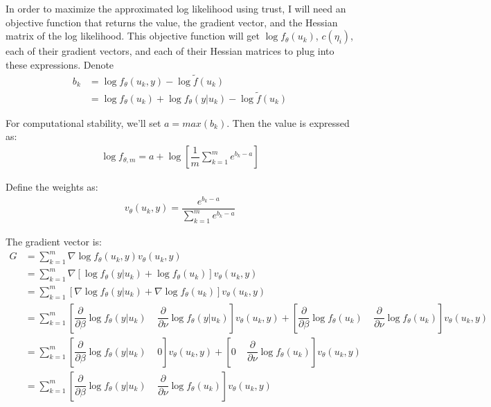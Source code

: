 \documentclass{article}
\begin{document}
In order to maximize the approximated log likelihood using trust, I will need an objective function that returns the value, the gradient vector, and the Hessian matrix of the log likelihood.  This objective function will get $\log f_\theta (u_k)$, $c(\eta_i)$, each of their gradient vectors, and each of their Hessian matrices to plug into these expressions.    Denote\\
\begin{align}
b_k &=  \log f_\theta (u_k,y)- \log \tilde{f} (u_k) \\
&= \log f_\theta (u_k) + \log f_\theta (y|u_k) - \log \tilde{f} (u_k) \label{eq:MCLA}
\end{align}


For computational stability, we'll set $a=max(b_k)$. Then the value is expressed as:\\
\begin{align}
\log f_{\theta,m} = a+ \log \left[ \dfrac{1}{m}  \sum_{k=1}^m e^{b_k-a} \right]
\end{align}

Define the weights as:\\
\begin{align}
v_\theta(u_k,y) = \dfrac{e^{b_k-a}}{ \sum_{k=1}^m e^{b_k-a}} 
\end{align}

The gradient vector is: \\
\begin{align}
G &= \sum_{k=1}^m \nabla \log f_\theta (u_k,y) v_\theta(u_k,y)\\ \label{eq:gradient}
&= \sum_{k=1}^m \nabla \left[  \log f_\theta(y|u_k) + \log f_\theta (u_k)  \right] v_\theta(u_k,y)\\
&= \sum_{k=1}^m  \left[ \nabla \log f_\theta(y|u_k) + \nabla\log f_\theta (u_k)  \right] v_\theta(u_k,y)\\
&= \sum_{k=1}^m  \left[ \dfrac{\partial}{\partial \beta} \log f_\theta(y|u_k) \; \; \; \;  \dfrac{\partial}{\partial \nu} \log f_\theta(y|u_k) \right] v_\theta(u_k,y)+ \left[ \dfrac{\partial}{\partial \beta} \log f_\theta(u_k) \; \; \; \; \dfrac{\partial}{\partial \nu} \log f_\theta(u_k) \right] v_\theta(u_k,y)\\
&= \sum_{k=1}^m  \left[ \dfrac{\partial}{\partial \beta} \log f_\theta(y|u_k) \; \; \; \; 0 \right] v_\theta(u_k,y)+ \left[ 0 \; \; \; \; \dfrac{\partial}{\partial \nu} \log f_\theta(u_k) \right] v_\theta(u_k,y)\\
&= \sum_{k=1}^m  \left[ \dfrac{\partial}{\partial \beta} \log f_\theta(y|u_k) \; \; \; \; \dfrac{\partial}{\partial \nu} \log f_\theta(u_k) \right] v_\theta(u_k,y)
\end{align}
\end{document}
